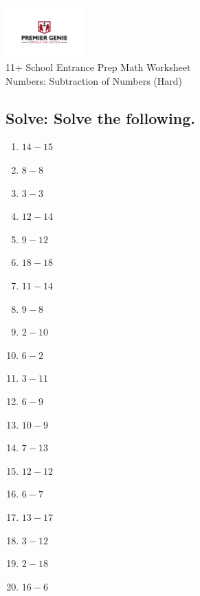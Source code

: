 \documentclass{article}
\begin{document}
\begin{center}
\includegraphics[width=3cm]{PREMGENIEJPG.jpg}\\
{\Large 11+ School Entrance Prep Math Worksheet}\\
{\Medium Numbers: Subtraction of Numbers (Hard)}\\

\end{center}

\subsection*{Solve: Solve the following.}

\begin{enumerate}
\item $\displaystyle {14}-{15} $ \ 
\item $\displaystyle {8}-{8} $ \ 
\item $\displaystyle {3}-{3} $ \ 
\item $\displaystyle {12}-{14} $ \ 
\item $\displaystyle {9}-{12} $ \ 
\item $\displaystyle {18}-{18} $ \ 
\item $\displaystyle {11}-{14} $ \ 
\item $\displaystyle {9}-{8} $ \ 
\item $\displaystyle {2}-{10} $ \ 
\item $\displaystyle {6}-{2} $ \ 
\item $\displaystyle {3}-{11} $ \ 
\item $\displaystyle {6}-{9} $ \ 
\item $\displaystyle {10}-{9} $ \ 
\item $\displaystyle {7}-{13} $ \ 
\item $\displaystyle {12}-{12} $ \ 
\item $\displaystyle {6}-{7} $ \ 
\item $\displaystyle {13}-{17} $ \ 
\item $\displaystyle {3}-{12} $ \ 
\item $\displaystyle {2}-{18} $ \ 
\item $\displaystyle {16}-{6} $ \ 


\end{enumerate}
\end{document}
